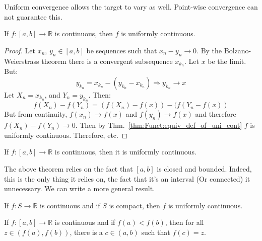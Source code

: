 \documentclass[crop=false,class=book,oneside]{standalone}
\begin{document}
            Uniform convergence allows the target to
            vary as well. Point-wise convergence can
            not guarantee this.
            \begin{theorem}
                If $f:[a,b]\rightarrow\mathbb{R}$ is continuous,
                then $f$ is uniformly continuous.
            \end{theorem}
            \begin{proof}
                Let $x_{n}$, $y_{n}\in[a,b]$ be sequences such
                that $x_{n}-y_{n}\rightarrow{0}$. By the
                Bolzano-Weierstrass theorem there is a
                convergent subsequence $x_{k_{n}}$. Let $x$
                be the limit. But:
                \begin{equation*}
                    y_{k_{n}}=x_{k_{n}}-(y_{k_{n}}-x_{k_{n}})
                    \Rightarrow
                    y_{k_{n}}\rightarrow{x}
                \end{equation*}
                Let $X_{n}=x_{k_{n}}$, and $Y_{n}=y_{k_{n}}$. Then:
                \begin{equation*}
                    f(X_{n})-f(Y_{n})=(f(X_{n})-f(x))-(f(Y_{n}-f(x))
                \end{equation*}
                But from continuity, $f(x_{n})\rightarrow{f(x)}$
                and $f(y_{n})\rightarrow{f(x)}$ and therefore
                $f(X_{n})-f(Y_{n})\rightarrow{0}$. Then by
                Thm.~\ref{thm:Funct:equiv_def_of_uni_cont}
                $f$ is uniformly continuous. Therefore, etc.
            \end{proof}
            \begin{theorem}
                If $f:[a,b]\rightarrow\mathbb{R}$ is
                continuous, then it is uniformly continuous.
            \end{theorem}
            The above theorem relies on the fact that
            $[a,b]$ is closed and bounded. Indeed, this is
            the only thing it relies on, the fact that it's
            an interval (Or connected) it unnecessary. We can
            write a more general result.
            \begin{theorem}
                    If $f:S\rightarrow\mathbb{R}$ is continuous
                    and if $S$ is compact, then $f$ is
                    uniformly continuous.
                \end{theorem}
            \begin{theorem}
                    If $f:[a,b]\rightarrow\mathbb{R}$
                    is continuous and
                    if $f(a)<f(b)$, then for all $z\in(f(a),f(b))$,
                    there is a $c\in(a,b)$ such that $f(c)=z$.
                \end{theorem}
\end{document}
